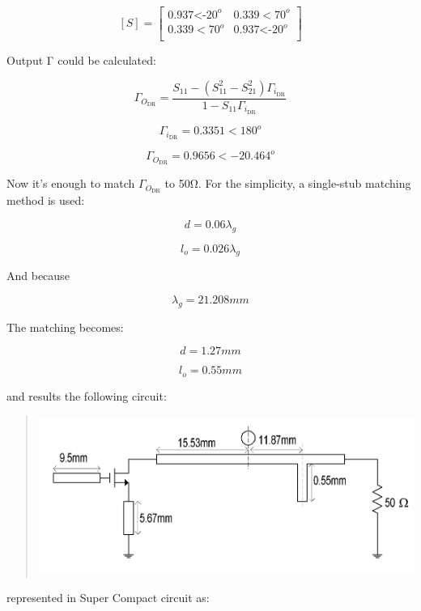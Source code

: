 \[\left\lbrack S \right\rbrack = \begin{bmatrix}
0\text{.937<-}\text{20}^{o} & 0\text{.339} < \text{70}^{o} \\
0\text{.339} < \text{70}^{o} & 0\text{.937<-}\text{20}^{o} \\
\end{bmatrix}\]

Output Γ could be calculated:

\[\Gamma_{O_{\text{DR}}} = \frac{S_{11} - \left( S_{11}^{2} - S_{21}^{2} \right)\Gamma_{i_{\text{DR}}}}{1 - S_{11}\Gamma_{i_{\text{DR}}}}\]

\[\Gamma_{i_{\text{DR}}} = 0.3351 < 180^{o}\]

\[\Gamma_{O_{\text{DR}}} = 0.9656 < - 20.464^{o}\]

Now it's enough to match \(\Gamma_{O_{\text{DR}}}\) to 50Ω. For the
simplicity, a single-stub matching method is used:

\[d = 0.06\lambda_{g}\]

\[l_{o} = 0.026\lambda_{g}\]

And because

\[\lambda_{g} = 21.208mm\]

The matching becomes:

\[d = 1.27mm\]

\[l_{o} = 0.55mm\]

and results the following circuit:

\begin{quote}
\includegraphics[width=5in,height=2.05556in]{media/image15.png}
\end{quote}

represented in Super Compact circuit as:


